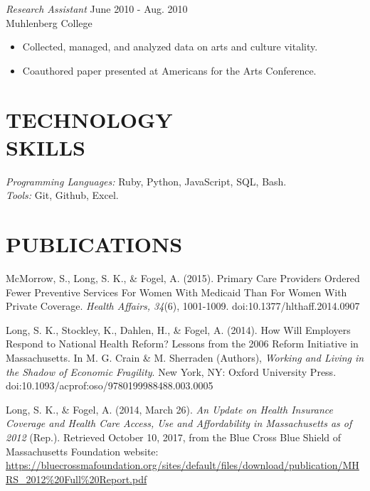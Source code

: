 \documentclass[margin, 10pt]{res} %
\begin{document}
\begin{resume}
{\sl Research Assistant } \hfill June 2010 - Aug. 2010 \\
Muhlenberg College
\begin{itemize} \itemsep -2pt %
\item Collected, managed, and analyzed data on arts and culture vitality.
\item Coauthored paper presented at Americans for the Arts Conference.
\end{itemize}


\section{\small\bf TECHNOLOGY \\ SKILLS}

{\sl Programming Languages:} Ruby, Python, JavaScript, SQL, Bash. \\
{\sl Tools:} Git, Github, Excel. \\

\section{\small\bf PUBLICATIONS}
McMorrow, S., Long, S. K., \& Fogel, A. (2015). Primary Care Providers Ordered Fewer Preventive Services For Women With Medicaid Than For Women With Private Coverage. {\sl Health Affairs, 34}(6), 1001-1009. doi:10.1377/hlthaff.2014.0907

Long, S. K., Stockley, K., Dahlen, H., \& Fogel, A. (2014). How Will Employers Respond to National Health Reform? Lessons from the 2006 Reform Initiative in Massachusetts. In M. G. Crain \& M. Sherraden (Authors), {\sl Working and Living in the Shadow of Economic Fragility}. New York, NY: Oxford University Press. doi:10.1093/acprof:oso/9780199988488.003.0005

Long, S. K., \& Fogel, A. (2014, March 26). {\sl An Update on Health Insurance Coverage and Health Care Access, Use and Affordability in Massachusetts as of 2012} (Rep.). Retrieved October 10, 2017, from the Blue Cross Blue Shield of Massachusetts Foundation website: \url{https://bluecrossmafoundation.org/sites/default/files/download/publication/MHRS_2012%20Full%20Report.pdf}


\end{resume}
\end{document}
